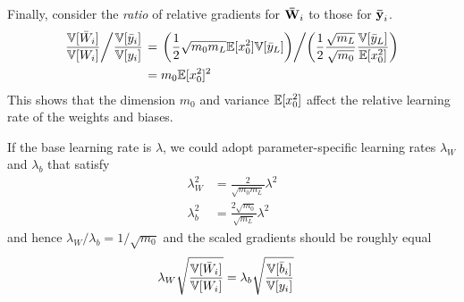 
Finally, consider the \emph{ratio} of relative gradients for $\boldsymbol{\mathbf{\bar{W}}}_{i}$ to those for $\boldsymbol{\mathbf{\bar{y}}}_{i}$.
\begin{align}
\left. \frac{\mathbb{V}[\bar{W}_{i}]}{\mathbb{V}[W_{i}]} \middle/ \frac{\mathbb{V}[\bar{y}_{i}]}{\mathbb{V}[y_{i}]} \right.
& = \left.
  \left( \frac{1}{2} \sqrt{m_{0} m_{L}} \mathbb{E}[x_{0}^2] \mathbb{V}[\bar{y}_{L}] \right) \middle/
  \left( \frac{1}{2} \frac{\sqrt{m_{L}}}{\sqrt{m_{0}}} \frac{\mathbb{V}[\bar{y}_{L}]}{\mathbb{E}[x_{0}^2]} \right) \right. \\
& = m_{0} \mathbb{E}[x_{0}^2]^2
\end{align}
This shows that the dimension $m_{0}$ and variance $\mathbb{E}[x_{0}^2]$ affect the relative learning rate of the weights and biases.

If the base learning rate is $\lambda$, we could adopt parameter-specific learning rates $\lambda_{W}$ and $\lambda_{b}$ that satisfy
\begin{align}
\lambda_{W}^2 & = \frac{2}{\sqrt{m_{0} m_{L}}} \lambda^2 \\
\lambda_{b}^2 & = \frac{2 \sqrt{m_{0}}}{\sqrt{m_{L}}} \lambda^2
\end{align}
and hence $\lambda_{W} / \lambda_{b} = 1 / \sqrt{m_{0}}$ and the scaled gradients should be roughly equal
\begin{align}
\lambda_{W} \sqrt{\frac{\mathbb{V}[\bar{W}_{i}]}{\mathbb{V}[W_{i}]}} & = \lambda_{b} \sqrt{\frac{\mathbb{V}[\bar{b}_{i}]}{\mathbb{V}[y_{i}]}}
\end{align}

